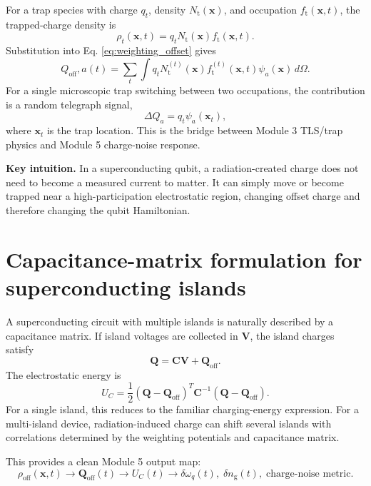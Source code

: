 \documentclass[11pt]{article}
\newcommand{\Om}{\Omega}
\newcommand{\x}{\bm{x}}
\newcommand{\ngate}{n_{\mathrm{g}}}
\newcommand{\Qoff}{Q_{\mathrm{off}}}
\newcommand{\Cmat}{\bm{C}}
\newcommand{\Vvec}{\bm{V}}
\newcommand{\Qvec}{\bm{Q}}
\newcommand{\Nt}{N_{\mathrm{t}}}
\newcommand{\ft}{f_{\mathrm{t}}}
\newcommand{\rhooff}{\rho_{\mathrm{off}}}
\newcommand{\wpot}{\psi}
\begin{document}
For a trap species with charge \(q_t\), density \(\Nt(\x)\), and occupation \(\ft(\x,t)\), the trapped-charge density is
\begin{equation}
\rho_t(\x,t)=q_t\Nt(\x)\ft(\x,t).
\end{equation}
Substitution into Eq. \eqref{eq:weighting_offset} gives
\begin{equation}
\Qoff,a(t)=\sum_t\int q_t\Nt^{(t)}(\x)\ft^{(t)}(\x,t)\wpot_a(\x)\,d\Om.
\end{equation}
For a single microscopic trap switching between two occupations, the contribution is a random telegraph signal,
\begin{equation}
\Delta Q_{a}=q_t\wpot_a(\x_t),
\end{equation}
where \(\x_t\) is the trap location. This is the bridge between Module 3 TLS/trap physics and Module 5 charge-noise response.

\begin{physicsbox}
\textbf{Key intuition.} In a superconducting qubit, a radiation-created charge does not need to become a measured current to matter. It can simply move or become trapped near a high-participation electrostatic region, changing offset charge and therefore changing the qubit Hamiltonian.
\end{physicsbox}

\section{Capacitance-matrix formulation for superconducting islands}

A superconducting circuit with multiple islands is naturally described by a capacitance matrix. If island voltages are collected in \(\Vvec\), the island charges satisfy
\begin{equation}
\Qvec = \Cmat \Vvec + \Qvec_{\mathrm{off}}.
\end{equation}
The electrostatic energy is
\begin{equation}
U_C=\frac{1}{2}\left(\Qvec-\Qvec_{\mathrm{off}}\right)^T \Cmat^{-1}\left(\Qvec-\Qvec_{\mathrm{off}}\right).
\label{eq:cap_matrix_energy}
\end{equation}
For a single island, this reduces to the familiar charging-energy expression. For a multi-island device, radiation-induced charge can shift several islands with correlations determined by the weighting potentials and capacitance matrix.

This provides a clean Module 5 output map:
\begin{equation}
\boxed{\rhooff(\x,t) \longrightarrow \Qvec_{\mathrm{off}}(t) \longrightarrow U_C(t) \longrightarrow \delta\omega_q(t),\;\delta\ngate(t),\;\text{charge-noise metric}.}
\end{equation}
\end{document}
